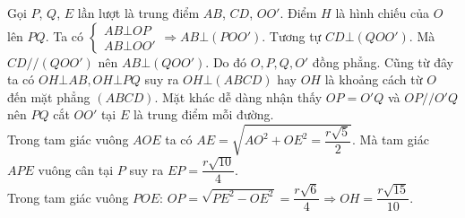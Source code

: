 \begin{vd}
{Gọi $P$, $Q$, $E$ lần lượt là trung điểm $AB$, $CD$, $OO'$. Điểm $H$ là hình chiếu của $O$ lên $PQ$. 
Ta có 	$ \left\{\begin{array}{l} AB\bot OP \\ AB\bot OO' \end{array} \right.  \Rightarrow AB\bot (POO') $. Tương tự $ CD\bot (QOO') $. Mà $ CD // (QOO') $ nên $ AB\bot (QOO') $. Do đó $ O, P, Q, O' $ đồng phẳng. Cũng từ đây ta có  $OH\bot AB, OH\bot PQ $ suy ra  $OH\bot (ABCD)$ hay $OH$ là khoảng cách từ $O$ đến mặt phẳng $(ABCD)$.
 Mặt khác dễ dàng nhận thấy $ OP=O'Q$ và $ OP//O'Q$ nên $ PQ$ cắt $ OO'$ tại $ E$ là trung điểm mỗi đường.\\
  Trong tam giác vuông $AOE$ ta có  $AE=\sqrt{AO^2+OE^2=\dfrac{r\sqrt{5}}{2}}$. Mà tam giác $APE$ vuông cân tại $P$ suy ra $EP=\dfrac{r\sqrt{10}}{4}$.\\ 
 Trong tam giác vuông $POE$: $OP=\sqrt{PE^2-OE^2}=\dfrac{r\sqrt{6}}{4}\Rightarrow OH=\dfrac{r\sqrt{15}}{10}$.
}
\end{vd}


